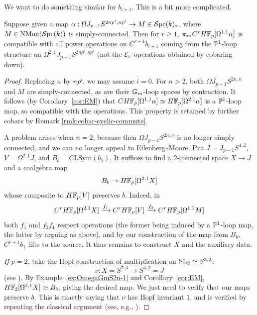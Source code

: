 \documentclass{amsart}
\renewcommand{\NB}[1]{}
\numberwithin{proposition}{section}
\numberwithin{equation}{section}
\def\LSym{\mathrm{LSym}}
\def\NMon{\mathrm{NMon}}
\begin{document}
We want to do something similar for $b_{i+1}$.
This is a bit more complicated.
\begin{lemma} \label{lemm:b-family}
Suppose given a map $\alpha: \Omega J_{p-1}S^{2np^i,np^i} \to M \in \Spc(k)_*$, where $M \in \NMon(\Spc(k))$ is simply-connected.
Then for $r \ge 1$, $\pi_{**} C^r H\F_p[\Omega^{1,1} \alpha]$ is compatible with all power operations on $C^{r+1} b_{i+1}$ coming from the $\P^1$-loop structure on $\Omega^{2,1} J_{p-1}S^{2np^i,np^i}$ (not the $\scr E_r$-operations obtained by cobaring down).
\end{lemma}
\begin{proof}
Replacing $n$ by $np^i$, we may assume $i=0$.
For $n>2$, both $\Omega J_{p-1}S^{2n,n}$ and $M$ are simply-connected, as are their $\Gm$-loop spaces by contraction.
It follows (by Corollary~\ref{cor:EM}) that $CH\F_p[\Omega^{1,1} \alpha] \wequi H\F_p[\Omega^{2,1} \alpha]$ is a $\P^1$-loop map, so compatible with the operations.
This property is retained by further cobars by Remark \ref{rmk:cobar-cyclic-commute}.

A problem arises when $n=2$, because then $\Omega J_{p-1}S^{2n,n}$ is no longer simply connected, and we can no longer appeal to Eilenberg--Moore.\NB{The comparison map is, in fact, not an equivalence.}
Put $J=J_{p-1}S^{4,2}$, $V=\Omega^{2,1}J$, and $B_b=C\LSym(b_1)$.
It suffices to find a $2$-connected space $X \to J$ and a coalgebra map \[ B_b \to H\F_p[\Omega^{2,1}X] \] whose composite to $H\F_p[V]$ preserves $b$.
Indeed, in \[ C^rH\F_p[\Omega^{2,1}X]\xrightarrow{f_1} C^rH\F_p[V]\xrightarrow{f_2} C^rH\F_p[\Omega^{1,1}M] \] both $f_1$ and $f_2f_1$ respect operations (the former being induced by a $\P^1$-loop map, the latter by arguing as above), and by our construction of the map from $B_b$, $C^{r+1}b_1$ lifts to the source.
It thus remains to construct $X$ and the auxiliary data.

\emph{If $p=2$,} take the Hopf construction of multiplication on $\SL_2\simeq S^{3,2}$:
\[
\nu:X=S^{7,4}\longrightarrow S^{4,2}=J
\]
(see \cite[\S4.6]{dugger-isaksen-hopf}).
By Example~\ref{ex:OmegaGmS2n-1} and Corollary~\ref{cor:EM}, $H\F_2[\Omega^{2,1}X] \wequi B_b$, giving the desired map.
We just need to verify that our maps preserve $b$.
This is exactly saying that $\nu$ has Hopf invariant $1$, and is verified by repeating the classical argument (see, e.g., \cite[\S4B]{hatcher606algebraic}).


\end{proof}
\end{document}
